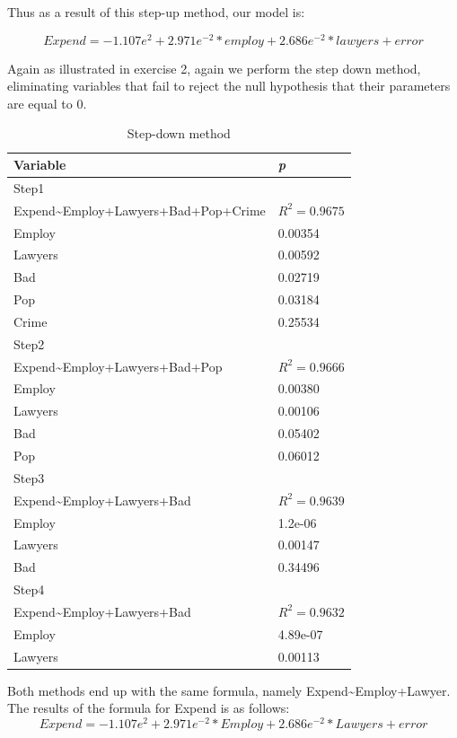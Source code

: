 \documentclass{article}
\begin{document}
Thus as a result of this step-up method, our model is:

$$Expend = -1.107e^2 + 2.971e^{-2}*employ + 2.686e^{-2}*lawyers + error$$    
    
    Again as illustrated in exercise 2, again we perform the step down method, eliminating variables that fail to reject the null hypothesis that their parameters are equal to 0.
    
    
    \begin{table}[H]
    \begin{center}
    \begin{tabular}{|ll|}
        \hline
        Variable & \textit{p} \\
        \hline 
        Step1&\\
        \hline
        Expend\textasciitilde Employ+Lawyers+Bad+Pop+Crime & $R^2 = 0.9675$ \\
        Employ & 0.00354 \\
        Lawyers & 0.00592 \\
        Bad & 0.02719 \\
        Pop & 0.03184 \\
        Crime & 0.25534\\
        \hline
        Step2&\\
        \hline 
        Expend\textasciitilde Employ+Lawyers+Bad+Pop & $R^2 = 0.9666$ \\
        Employ & 0.00380 \\
        Lawyers & 0.00106 \\
        Bad & 0.05402 \\
        Pop & 0.06012 \\
        \hline
        Step3&\\
        \hline 
        Expend\textasciitilde Employ+Lawyers+Bad & $R^2 = 0.9639$ \\
        Employ & 1.2e-06 \\
        Lawyers & 0.00147 \\
        Bad & 0.34496 \\
        \hline
        Step4&\\
        \hline 
        Expend\textasciitilde Employ+Lawyers+Bad & $R^2 = 0.9632$ \\
        Employ & 4.89e-07 \\
        Lawyers & 0.00113 \\
        \hline
    \end{tabular}
    \caption{Step-down method}
    \label{table:step-down}
    \end{center}
    \end{table}
    Both methods end up with the same formula, namely Expend\textasciitilde Employ+Lawyer.
    The results of the formula for Expend is as follows:
    \[
      Expend = -1.107e^2 + 2.971e^{-2} * Employ + 2.686e^{-2} * Lawyers + error
    \]
    \\
\end{document}
